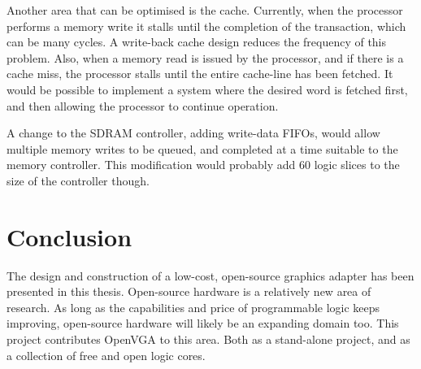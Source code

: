 Another area that can be optimised is the cache. Currently, when the processor
performs a memory write it stalls until the completion of the transaction, which
can be many cycles. A write-back cache design reduces the frequency of this
problem. Also, when a memory read is issued by the processor, and if there is a
cache miss, the processor stalls until the entire cache-line has been fetched. It
would be possible to implement a system where the desired word is fetched first,
and then allowing the processor to continue operation.

A change to the SDRAM controller, adding write-data FIFOs, would allow multiple
memory writes to be queued, and completed at a time suitable to the memory
controller. This modification would probably add 60 logic slices to the size of
the controller though.


\section{Conclusion}
The design and construction of a low-cost, open-source graphics adapter has been
presented in this thesis. Open-source hardware is a relatively new area of
research. As long as the capabilities and price of programmable logic keeps
improving, open-source hardware will likely be an expanding domain too. This
project contributes OpenVGA to this area. Both as a stand-alone project, and as a
collection of free and open logic cores.
